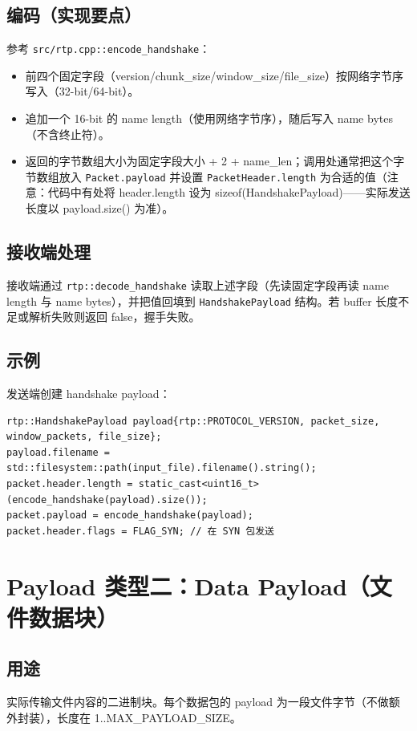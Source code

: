 \documentclass[11pt,a4paper]{article}
\begin{document}
\subsection{编码（实现要点）}
参考 \texttt{src/rtp.cpp::encode\_handshake}：
\begin{itemize}
  \item 前四个固定字段（version/chunk_size/window_size/file_size）按网络字节序写入（32-bit/64-bit）。
  \item 追加一个 16-bit 的 name length（使用网络字节序），随后写入 name bytes（不含终止符）。
  \item 返回的字节数组大小为固定字段大小 + 2 + name_len；调用处通常把这个字节数组放入 \texttt{Packet.payload} 并设置 \texttt{PacketHeader.length} 为合适的值（注意：代码中有处将 header.length 设为 sizeof(HandshakePayload)——实际发送长度以 payload.size() 为准）。
\end{itemize}

\subsection{接收端处理}
接收端通过 \texttt{rtp::decode\_handshake} 读取上述字段（先读固定字段再读 name length 与 name bytes），并把值回填到 \texttt{HandshakePayload} 结构。若 buffer 长度不足或解析失败则返回 false，握手失败。

\subsection{示例}
发送端创建 handshake payload：
\begin{verbatim}
rtp::HandshakePayload payload{rtp::PROTOCOL_VERSION, packet_size, window_packets, file_size};
payload.filename = std::filesystem::path(input_file).filename().string();
packet.header.length = static_cast<uint16_t>(encode_handshake(payload).size());
packet.payload = encode_handshake(payload);
packet.header.flags = FLAG_SYN; // 在 SYN 包发送
\end{verbatim}

\section{Payload 类型二：Data Payload（文件数据块）}
\subsection{用途}
实际传输文件内容的二进制块。每个数据包的 payload 为一段文件字节（不做额外封装），长度在 1..MAX\_PAYLOAD\_SIZE。
\end{document}
